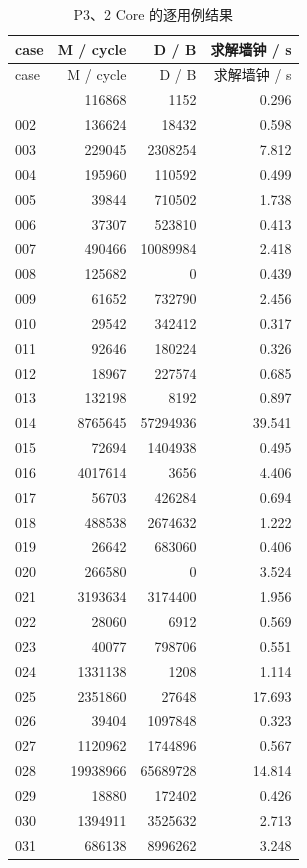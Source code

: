 \documentclass[anonymous,notoc]{gmcm2026}
\begin{document}
\begin{longtable}{lrrr}
\caption{P3、2 Core 的逐用例结果}\\
\toprule
case & M / cycle & D / B & 求解墙钟 / s\\\midrule
\endfirsthead
\toprule
case & M / cycle & D / B & 求解墙钟 / s\\\midrule
\endhead
\bottomrule\endfoot
001 & 116868 & 1152 & 0.296 \\
002 & 136624 & 18432 & 0.598 \\
003 & 229045 & 2308254 & 7.812 \\
004 & 195960 & 110592 & 0.499 \\
005 & 39844 & 710502 & 1.738 \\
006 & 37307 & 523810 & 0.413 \\
007 & 490466 & 10089984 & 2.418 \\
008 & 125682 & 0 & 0.439 \\
009 & 61652 & 732790 & 2.456 \\
010 & 29542 & 342412 & 0.317 \\
011 & 92646 & 180224 & 0.326 \\
012 & 18967 & 227574 & 0.685 \\
013 & 132198 & 8192 & 0.897 \\
014 & 8765645 & 57294936 & 39.541 \\
015 & 72694 & 1404938 & 0.495 \\
016 & 4017614 & 3656 & 4.406 \\
017 & 56703 & 426284 & 0.694 \\
018 & 488538 & 2674632 & 1.222 \\
019 & 26642 & 683060 & 0.406 \\
020 & 266580 & 0 & 3.524 \\
021 & 3193634 & 3174400 & 1.956 \\
022 & 28060 & 6912 & 0.569 \\
023 & 40077 & 798706 & 0.551 \\
024 & 1331138 & 1208 & 1.114 \\
025 & 2351860 & 27648 & 17.693 \\
026 & 39404 & 1097848 & 0.323 \\
027 & 1120962 & 1744896 & 0.567 \\
028 & 19938966 & 65689728 & 14.814 \\
029 & 18880 & 172402 & 0.426 \\
030 & 1394911 & 3525632 & 2.713 \\
031 & 686138 & 8996262 & 3.248 \\

\end{longtable}
\end{document}
